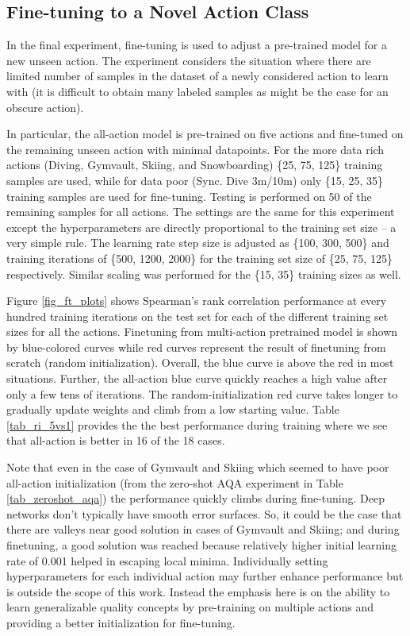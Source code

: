 \documentclass[10pt,twocolumn,letterpaper]{article}
\begin{document}
\subsection{Fine-tuning to a Novel Action Class}
\label{exp_3}
In the final experiment, fine-tuning is used to adjust a pre-trained model for a new unseen action.  The experiment considers the situation where there are limited number of samples in the dataset of a newly considered action to learn with (\ie it is difficult to obtain many labeled samples as might be the case for an obscure action).  

In particular, the all-action model is pre-trained on five actions and fine-tuned on the remaining unseen action with minimal datapoints.  For the more data rich actions (Diving, Gymvault, Skiing, and Snowboarding) \{25, 75, 125\} training samples are used, while for data poor (Sync. Dive 3m/10m) only \{15, 25, 35\} training samples are used for fine-tuning.  Testing is performed on 50 of the remaining samples for all actions.  The settings are the same for this experiment except the hyperparameters are directly proportional to the training set size -- a very simple rule.  The learning rate step size is adjusted as \{100, 300, 500\} and training iterations of \{500, 1200, 2000\} for the training set size of \{25, 75, 125\} respectively.  Similar scaling was performed for the \{15, 35\} training sizes as well.   

Figure \ref{fig_ft_plots} shows Spearman's rank correlation performance at every hundred training iterations on the test set for each of the different training set sizes for all the actions. Finetuning from multi-action pretrained model is shown by blue-colored curves while red curves represent the result of finetuning from scratch (\ie random initialization). Overall, the blue curve is above the red in most situations.  Further, the all-action blue curve quickly reaches a high value after only a few tens of iterations.  The random-initialization red curve takes longer to gradually update weights and climb from a low starting value.  Table \ref{tab_ri_5vs1} provides the the best performance during training where we see that all-action is better in 16 of the 18 cases.  

Note that even in the case of Gymvault and Skiing which seemed to have poor all-action initialization (from the zero-shot AQA experiment in Table \ref{tab_zeroshot_aqa}) the performance quickly climbs during fine-tuning.  Deep networks don't typically have smooth error surfaces. So, it could be the case that there are valleys near good solution in cases of Gymvault and Skiing; and during finetuning, a good solution was reached because relatively higher initial learning rate of 0.001 helped in escaping local minima.  Individually setting hyperparameters for each individual action may further enhance performance but is outside the scope of this work.  Instead the emphasis here is on the ability to learn generalizable quality concepts by pre-training on multiple actions and providing a better initialization for fine-tuning.  
\end{document}
